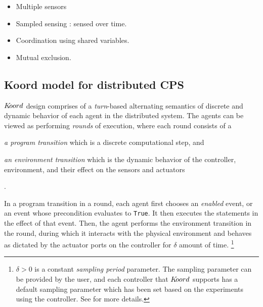 \begin{itemize}
    \item Multiple sensors
    \item Sampled sensing : sensed over time. 
    \item Coordination using shared variables. 
    \item Mutual exclusion. 
\end{itemize}

\subsection{Koord model for distributed CPS}


$K\kern-2pt oord$ design comprises of a \emph{turn}-based alternating semantics of discrete and dynamic behavior of each agent in the distributed system. The agents can be viewed as performing \emph{rounds} of execution, where each round consists of a \begin{inparaenum} 
\item \emph{a program transition} which is a discrete computational step, and 
\item \item \emph{an environment transition} which is the dynamic behavior of the controller, environment, and their effect on the sensors and actuators
\end{inparaenum}. 

In a program transition in a round, each agent first  chooses an \emph{enabled} event, or an event whose precondition evaluates to \verb|True|. It then executes the statements in the effect of that event. %
Then, the agent performs the environment transition in the round, during which it interacts with the physical environment and behaves as dictated by the actuator ports on the controller for $\delta$ amount of time.  \footnote{ $\delta>0$ is a constant \emph{sampling period} parameter. The sampling parameter can be provided by the user, and each controller that $K\kern-2pt oord$ supports has a default sampling parameter which has been set based on the experiments using the controller. See  for more details.}  %

